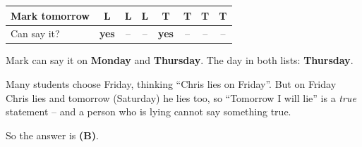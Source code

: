 {\begin{center}
\begin{tabular}{|l|c|c|c|c|c|c|c|}
Mark tomorrow & L & L & L & T & T & T & T \\ \hline
Can say it? & \textbf{yes} & -- & -- & \textbf{yes} & -- & -- & -- \\ \hline
\end{tabular}
\end{center}
Mark can say it on \textbf{Monday} and \textbf{Thursday}.
The day in both lists: \textbf{Thursday}.
\begin{warnbox}Many students choose Friday, thinking ``Chris lies on Friday''. But on Friday Chris lies and tomorrow (Saturday) he lies too,
so ``Tomorrow I will lie'' is a \emph{true} statement -- and a person who is lying cannot say something true.\end{warnbox}
So the answer is \textbf{(B)}.
}

